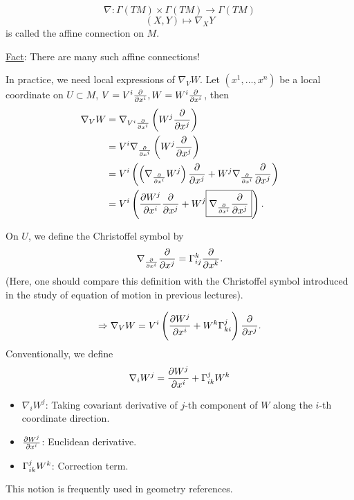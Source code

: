 \begin{definition}
    \[\nabla\colon \Gamma(TM)\times \Gamma (TM)\to \Gamma(TM)\]
    \[(X,Y)\mapsto \nabla_X Y\]
    is called the affine connection on \(M\).
\end{definition}
\underline{Fact}: There are many such affine connections!

In practice, we need local expressions of \(\nabla_V W\). Let 
\((x^1,\ldots,x^n)\) be a local coordinate on \(U\subset M\), 
\(V=V^i\pdv{x^i},W=W^i\pdv{x^i}\), then
\begin{align*}
    \nabla_V W &=\nabla_{V^i\pdv{x^i}}\left(W^j\pdv{x^j}\right)\\
    &= V^i\nabla_{\pdv{x^i}}\left(W^j \pdv{x^j}\right)\\
    &=V^i\left(\left(\nabla_{\pdv{x^i}} W^j\right)\pdv{x^j}
    + W^j \nabla_{\pdv{x^i}} \pdv{x^j}\right)\\
    &=V^i\left(\pdv{W^j}{x^i}\pdv{x^j}+W^j
    \boxed{\nabla_{\pdv{x^i}}\pdv{x^j}}\right).
\end{align*}
\begin{definition}
    On \(U\), we define the Christoffel symbol by 
    \[
        \nabla_{\pdv{x^i}}\pdv{x^j}=\Gamma\indices*{_{ij}^k}\pdv{x^k}.
    \]
    (Here, one should compare this definition with the Christoffel
    symbol introduced in the study of equation of motion 
    in previous lectures).
\end{definition}
\[
    \Rightarrow \nabla_V W= V^i\left(\pdv{W^j}{x^i}+W^k\Gamma
    \indices*{_{ki}^j}\right)\pdv{x^j}   .
\]
Conventionally, we define
\[
    \nabla_i W^j=\pdv{W^j}{x^i}+\Gamma\indices*{_{ik}^j}W^k    
\]
\begin{itemize}
    \item \(\nabla_i W^j\): Taking covariant derivative 
    of \(j\)-th component of \(W\) along the \(i\)-th coordinate
    direction.
    \item \(\pdv{W^j}{x^i}\): Euclidean derivative.
    \item \(\Gamma\indices*{_{ik}^j}W^k\): Correction term.
\end{itemize}
This notion is frequently used in geometry references.

